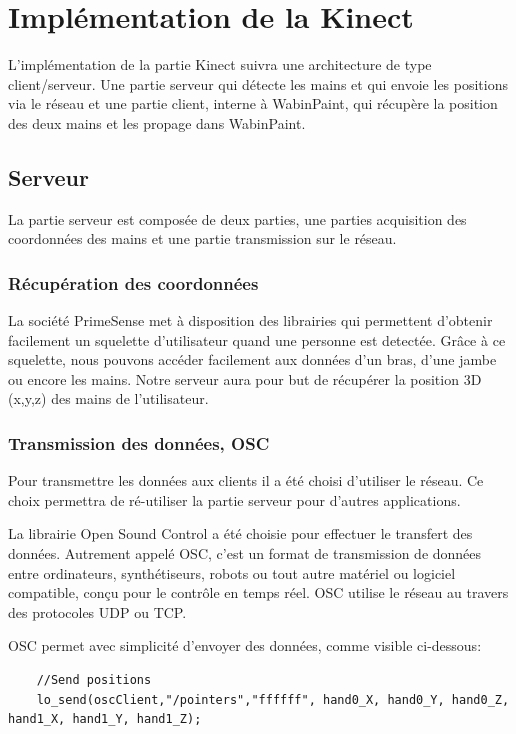 \chapter{Implémentation de la Kinect}

L'implémentation de la partie Kinect suivra une architecture de type client/serveur. Une partie serveur qui détecte les mains et qui envoie les positions via le réseau et une partie client, interne à WabinPaint, qui récupère la position des deux mains et les propage dans WabinPaint.

\section{Serveur}

La partie serveur est composée de deux parties, une parties acquisition des coordonnées des mains et une partie transmission sur le réseau.

\subsection{Récupération des coordonnées}
La société PrimeSense met à disposition des librairies \cite{kinect} qui permettent d'obtenir facilement un squelette d'utilisateur quand une personne est detectée. Grâce à ce squelette, nous pouvons accéder facilement aux données d'un bras, d'une jambe ou encore les mains. Notre serveur aura pour but de récupérer la position 3D (x,y,z) des mains de l'utilisateur. 

\subsection{Transmission des données, OSC}

Pour transmettre les données aux clients il a été choisi d'utiliser le réseau. Ce choix permettra de ré-utiliser la partie serveur pour d'autres applications.

La librairie Open Sound Control \cite{osc} a été choisie pour effectuer le transfert des données. Autrement appelé OSC, c'est un format de transmission de données entre ordinateurs, synthétiseurs, robots ou tout autre matériel ou logiciel compatible, conçu pour le contrôle en temps réel. OSC utilise le réseau au travers des protocoles UDP ou TCP.  

\newpage

OSC permet avec simplicité d'envoyer des données, comme visible ci-dessous:

\begin{lstlisting}
	//Send positions
	lo_send(oscClient,"/pointers","ffffff", hand0_X, hand0_Y, hand0_Z, hand1_X, hand1_Y, hand1_Z);
\end{lstlisting}

